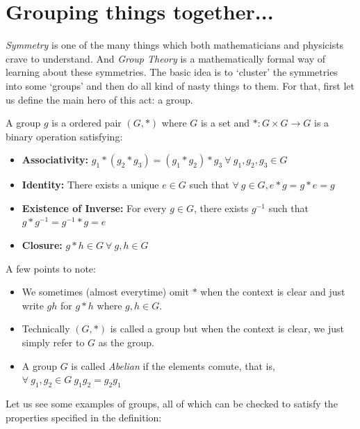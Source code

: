 \section{Grouping things together...}
\textit{Symmetry} is one of the many things which both mathematicians and physicists crave to understand. And \textit{Group Theory} is a mathematically formal way of learning about these symmetries. The basic idea is to `cluster' the symmetries into some `groups' and then do all kind of nasty things to them. For that, first let us define the main hero of this act: a group.
\begin{definition}[Group]
    A group $g$ is a ordered pair $(G,*)$ where $G$ is a set and $*:G\times G\rightarrow G$ is a binary operation satisfying:
    \begin{itemize}
        \item \textbf{Associativity:} $g_1*(g_2*g_3) = (g_1*g_2)*g_3 \ \forall \ g_1,g_2,g_3\in G$
        \item \textbf{Identity:} There exists a unique $ e\in G$ such that $\forall \ g \in G, e*g = g*e = g$
        \item \textbf{Existence of Inverse:} For every $g\in G$, there exists $g^{-1}$ such that $g*g^{-1} = g^{-1}*g = e$
        \item \textbf{Closure:} $g*h\in G \ \forall \ g,h\in G$
    \end{itemize}
\end{definition}
A few points to note:
\begin{itemize}
    \item We sometimes (almost everytime) omit $*$ when the context is clear and just write $gh$ for $g*h$ where $g,h\in G$.
    \item Technically $(G,*)$ is called a group but when the context is clear, we just simply refer to $G$ as the group.
    \item A group  $G$ is called \textit{Abelian} if the elements comute, that is, $\forall \ g_1,g_2 \in G \ g_1g_2 = g_2g_1$
\end{itemize}
Let us see some examples of groups, all of which can be checked to satisfy the properties specified in the definition:
